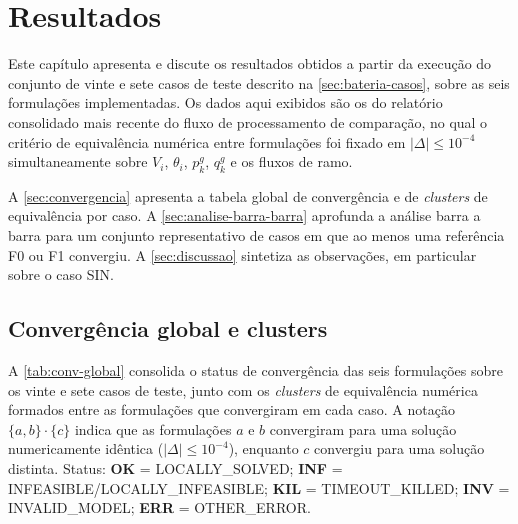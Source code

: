 \chapter{Resultados}
\label{chap:resultados}

Este capítulo apresenta e discute os resultados obtidos a partir da execução do conjunto de vinte e sete casos de teste descrito na \autoref{sec:bateria-casos}, sobre as seis formulações implementadas. Os dados aqui exibidos são os do relatório consolidado mais recente do fluxo de processamento de comparação, no qual o critério de equivalência numérica entre formulações foi fixado em $|\Delta| \le 10^{-4}$ simultaneamente sobre $V_i$, $\theta_i$, $p^g_k$, $q^g_k$ e os fluxos de ramo.

A \autoref{sec:convergencia} apresenta a tabela global de convergência e de \textit{clusters} de equivalência por caso. A \autoref{sec:analise-barra-barra} aprofunda a análise barra a barra para um conjunto representativo de casos em que ao menos uma referência F0 ou F1 convergiu. A \autoref{sec:discussao} sintetiza as observações, em particular sobre o caso SIN.

\section{Convergência global e clusters}
\label{sec:convergencia}

A \autoref{tab:conv-global} consolida o status de convergência das seis formulações sobre os vinte e sete casos de teste, junto com os \textit{clusters} de equivalência numérica formados entre as formulações que convergiram em cada caso. A notação $\{a,b\}\cdot\{c\}$ indica que as formulações $a$ e $b$ convergiram para uma solução numericamente idêntica ($|\Delta| \le 10^{-4}$), enquanto $c$ convergiu para uma solução distinta. Status: \textbf{OK} = LOCALLY\_SOLVED; \textbf{INF} = INFEASIBLE/LOCALLY\_INFEASIBLE; \textbf{KIL} = TIMEOUT\_KILLED; \textbf{INV} = INVALID\_MODEL; \textbf{ERR} = OTHER\_ERROR.

